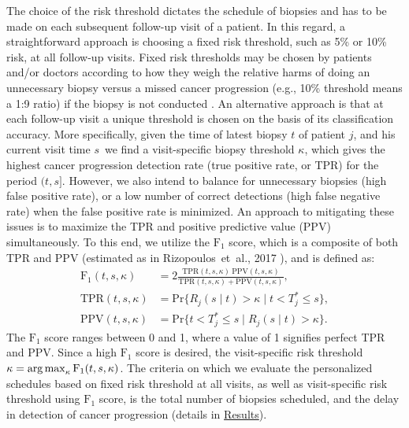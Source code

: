 The choice of the risk threshold dictates the schedule of biopsies and has to be made on each subsequent follow-up visit of a patient. In this regard, a straightforward approach is choosing a fixed risk threshold, such as 5\% or 10\% risk, at all follow-up visits. Fixed risk thresholds may be chosen by patients and/or doctors according to how they weigh the relative harms of doing an unnecessary biopsy versus a missed cancer progression (e.g., 10\% threshold means a 1:9 ratio) if the biopsy is not conducted \cite{vickers2006decision}. An alternative approach is that at each follow-up visit a unique threshold is chosen on the basis of its classification accuracy. More specifically, given the time of latest biopsy $t$ of patient $j$, and his current visit time $s$\, we find a visit-specific biopsy threshold $\kappa$, which gives the highest cancer progression detection rate (true positive rate, or TPR) for the period $(t, s]$. However, we also intend to balance for unnecessary biopsies (high false positive rate), or a low number of correct detections (high false negative rate) when the false positive rate is minimized. An approach to mitigating these issues is to maximize the TPR and positive predictive value (PPV) simultaneously. To this end, we utilize the $\mbox{F}_1$ score, which is a composite of both TPR and PPV (estimated as in Rizopoulos~et~al., 2017 \cite{landmarking2017}), and is defined as: 
\begin{equation}
\label{eq:F1_TPR_PPV}
\begin{split}
\mbox{F}_1(t,  s, \kappa) &= 2\frac{\mbox{TPR}(t,  s, \kappa)\ \mbox{PPV}(t,  s, \kappa)}{\mbox{TPR}(t,  s, \kappa) + \mbox{PPV}(t,  s, \kappa)},\\
\mbox{TPR}(t,  s, \kappa) &= \mbox{Pr}\big\{R_j(s \mid t) > \kappa \mid t < T^*_j \leq s\big\},\\
\mbox{PPV}(t,  s, \kappa) &= \mbox{Pr}\big\{t < T^*_j \leq s \mid R_j(s \mid t) > \kappa \big\}.
\end{split}
\end{equation}
The $\mbox{F}_1$ score ranges between 0 and 1, where a value of 1 signifies perfect TPR and PPV. Since a high $\mbox{F}_1$ score is desired, the visit-specific risk threshold ${\kappa=\operatorname{arg\,max}_{\kappa} \mbox{F}_1(t, s, \kappa)}$. The criteria on which we evaluate the personalized schedules based on fixed risk threshold at all visits, as well as visit-specific risk threshold using $\mbox{F}_1$ score, is the total number of biopsies scheduled, and the delay in detection of cancer progression (details in \hyperref[sec:results]{Results}). 